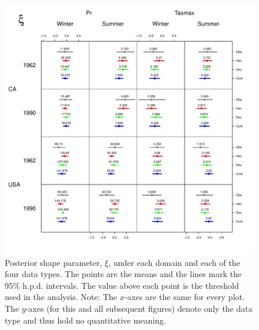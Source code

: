 \documentclass[12pt]{article}
\begin{document}
\begin{figure}
\begin{center}
\includegraphics[scale=0.72]{figs/shape.pdf}
\end{center}
\caption{Posterior shape parameter, $\xi$, under each domain and each of the four data types. The points are the means and the lines mark the 95\% h.p.d. intervals. The value above each point is the threshold used in the analysis. Note: The $x$-axes are the same for every plot. The $y$-axes (for this and all subsequent figures) denote only the data type and thus hold no quantitative meaning.}
\label{ksi}
\end{figure}
\end{document}
